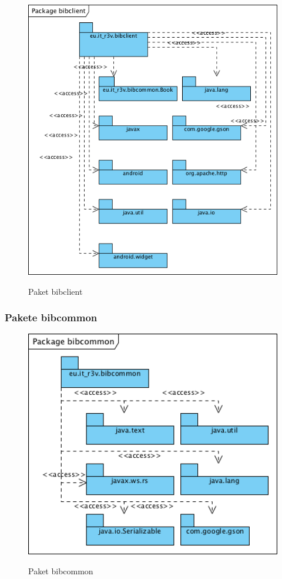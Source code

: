 \documentclass[fontsize=12pt,paper=a4,twoside]{scrartcl}
\begin{document}
\begin{figure} [H] 
\caption{Paket bibclient} \centering
	\includegraphics[width=1\textwidth]{Diagramme/Packagebibclient.png} 
	\label{pic:PackageClient} 
\end{figure}


\subsubsection{Pakete bibcommon}
\label{sec:bibcommon}

\begin{figure} [H] 
\caption{Paket bibcommon} \centering
	\includegraphics[width=1\textwidth]{Diagramme/Packagebibcommon.png} 
	\label{pic:PackageCommon} 
\end{figure}
\end{document}
